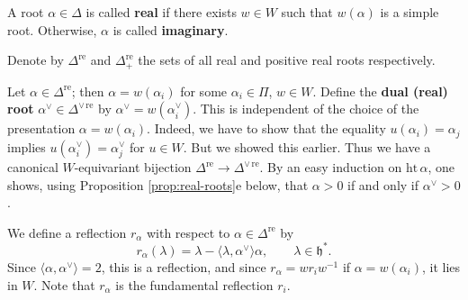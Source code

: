 \documentclass[12pt]{article}
\begin{document}
\begin{definition}
    A root $\alpha \in \Delta$ is called \textbf{real} if there exists $w \in W$ such that $w(\alpha)$ is a simple root. Otherwise, $\alpha$ is called \textbf{imaginary}.
\end{definition}
Denote by $\Delta^{\mathrm{re}}$ and $\Delta^{\mathrm{re}}_+$ the sets of all real and positive real roots respectively.

Let $\alpha \in \Delta^{\mathrm{re}}$; then $\alpha = w(\alpha_i)$ for some $\alpha_i \in \Pi$, $w \in W$. Define the \textbf{dual (real) root} $\alpha^\vee \in \Delta^{\vee\,\mathrm{re}}$ by $\alpha^\vee = w(\alpha_i^\vee)$. This is independent of the choice of the presentation $\alpha = w(\alpha_i)$. Indeed, we have to show that the equality $u(\alpha_i) = \alpha_j$ implies $u(\alpha_i^\vee) = \alpha_j^\vee$ for $u \in W$. But we showed this earlier. Thus we have a canonical $W$-equivariant bijection $\Delta^{\mathrm{re}} \to \Delta^{\vee\,\mathrm{re}}$. By an easy induction on $\mathrm{ht}\,\alpha$, one shows, using Proposition \ref{prop:real-roots}e below, that $\alpha > 0$ if and only if $\alpha^\vee > 0$.

We define a reflection $r_\alpha$ with respect to $\alpha \in \Delta^{\mathrm{re}}$ by
\[
    r_\alpha(\lambda) = \lambda - \langle \lambda, \alpha^\vee\rangle \alpha,
    \qquad \lambda \in \mathfrak{h}^*.
\]
Since $\langle \alpha,\alpha^\vee\rangle = 2$, this is a reflection, and since
$r_\alpha = w r_i w^{-1}$ if $\alpha = w(\alpha_i)$, it lies in $W$. Note that $r_\alpha$ is the fundamental reflection $r_i$.
\end{document}
